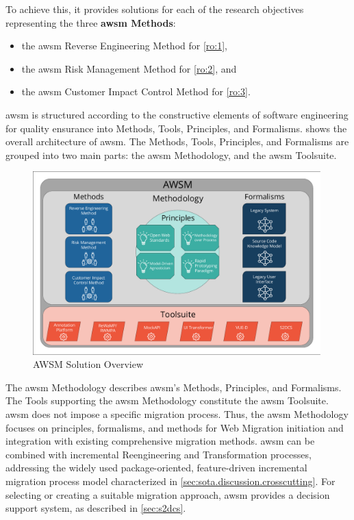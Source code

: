 To achieve this, it provides solutions for each of the research objectives representing the three \textbf{\gls{awsm} Methods}:

\begin{itemize}
\item the \gls{awsm} Reverse Engineering Method for \cref{ro:1},
\item the \gls{awsm} Risk Management Method for \cref{ro:2}, and
\item the \gls{awsm} Customer Impact Control Method for \cref{ro:3}.
\end{itemize}


\gls{awsm} is structured according to the constructive elements of software engineering for quality ensurance \autocite{Wallmueller2001SoftwareQuality} into Methods, Tools, Principles, and Formalisms.
 shows the overall architecture of \gls{awsm}.
The Methods, Tools, Principles, and Formalisms are grouped into two main parts: the \gls{awsm} Methodology, and the \gls{awsm} Toolsuite.

\begin{figure}[h!]
\hypertarget{fig:solution}{%
\centering
\includegraphics[width=0.99\textwidth]{../figures/solution2-defense.pdf}
\caption{AWSM Solution Overview}\label{fig:solution}
}
\end{figure}

The \gls{awsm} Methodology describes \gls{awsm}'s Methods, Principles, and Formalisms.
The Tools supporting the \gls{awsm} Methodology constitute the \gls{awsm} Toolsuite.
\gls{awsm} does not impose a specific migration process.
Thus, the \gls{awsm} Methodology focuses on principles, formalisms, and methods for \gls{Web Migration} initiation and integration with existing comprehensive migration methods.
\gls{awsm} can be combined with incremental \gls{Reengineering} and \gls{Transformation} processes, addressing the widely used package-oriented, feature-driven incremental migration process model characterized in \cref{sec:sota.discussion.crosscutting}.
For selecting or creating a suitable migration approach, \gls{awsm} provides a decision support system, as described in \cref{sec:s2dcs}.

